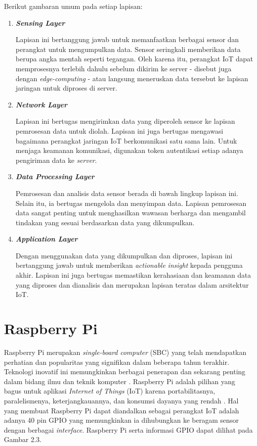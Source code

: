 \noindent Berikut gambaran umum pada setiap lapisan:
\begin{enumerate}
    \item \textbf{\textit{Sensing Layer}}

    Lapisan ini bertanggung jawab untuk memanfaatkan berbagai sensor dan perangkat untuk mengumpulkan data. Sensor seringkali memberikan data berupa angka mentah seperti tegangan. Oleh karena itu, perangkat IoT dapat memprosesnya terlebih dahulu sebelum dikirim ke server - disebut juga dengan \textit{edge-computing} - atau langsung meneruskan data tersebut ke lapisan jaringan untuk diproses di server.


    \item \textbf{\textit{Network Layer}}

    Lapisan ini bertugas mengirimkan data yang diperoleh sensor ke lapisan pemrosesan data untuk diolah. Lapisan ini juga bertugas mengawasi bagaimana perangkat jaringan IoT berkomunikasi satu sama lain. Untuk menjaga keamanan komunikasi, digunakan token autentikasi setiap adanya pengiriman data ke \textit{server}.

    \item \textbf{\textit{Data Processing Layer}}

    Pemrosesan dan analisis data sensor berada di bawah lingkup lapisan ini. Selain itu, ia bertugas mengelola dan menyimpan data. Lapisan pemrosesan data sangat penting untuk menghasilkan wawasan berharga dan mengambil tindakan yang sesuai berdasarkan data yang dikumpulkan.

    \item \textbf{\textit{Application Layer}}

    Dengan menggunakan data yang dikumpulkan dan diproses, lapisan ini bertanggung jawab untuk memberikan \textit{actionable insight} kepada pengguna akhir. Lapisan ini juga bertugas memastikan kerahasiaan dan keamanan data yang diproses dan dianalisis dan merupakan lapisan teratas dalam arsitektur IoT.

\end{enumerate}

\section{Raspberry Pi}

\noindent Raspberry Pi merupakan \textit{single-board computer} (SBC) yang telah mendapatkan perhatian dan popularitas yang signifikan dalam beberapa tahun terakhir. Teknologi inovatif ini memungkinkan berbagai penerapan dan sekarang penting dalam bidang ilmu dan teknik komputer \parencite{article:johnston}. Raspberry Pi adalah pilihan yang bagus untuk aplikasi \textit{Internet of Things} (IoT) karena portabilitasnya, paralelismenya, keterjangkauannya, dan konsumsi dayanya yang rendah \parencite{article:hosny}. Hal yang membuat Raspberry Pi dapat diandalkan sebagai perangkat IoT adalah adanya 40 pin GPIO yang memungkinkan ia dihubungkan ke beragam sensor dengan berbagai \textit{interface}. Raspberry Pi serta informasi GPIO dapat dilihat pada Gambar 2.3.

